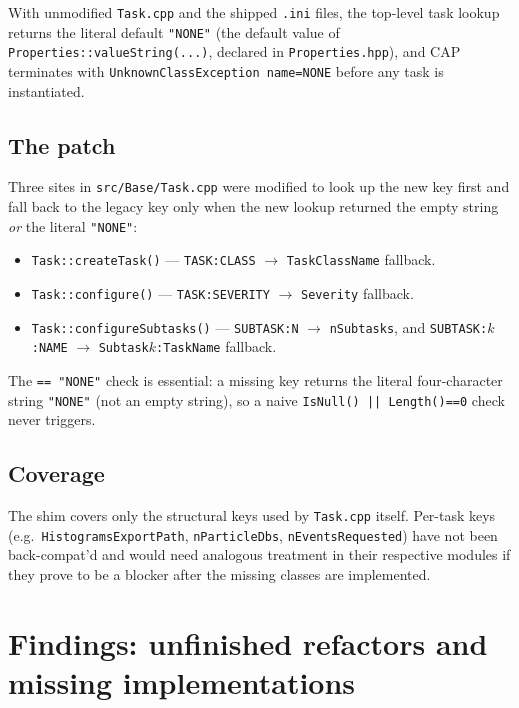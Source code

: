 \documentclass[11pt,a4paper]{article}
\begin{document}
\noindent
With unmodified \texttt{Task.cpp} and the shipped \texttt{.ini} files, the
top-level task lookup returns the literal default
\texttt{"NONE"} (the default value of
\texttt{Properties::valueString(...)},
declared in \texttt{Properties.hpp}), and CAP terminates with
\texttt{UnknownClassException name=NONE} before any task is instantiated.

\subsection{The patch}

Three sites in \texttt{src/Base/Task.cpp} were modified to look up the new
key first and fall back to the legacy key only when the new lookup
returned the empty string \emph{or} the literal \texttt{"NONE"}:

\begin{itemize}[leftmargin=2em,itemsep=0pt]
  \item \texttt{Task::createTask()} --- \texttt{TASK:CLASS}
        $\to$ \texttt{TaskClassName} fallback.
  \item \texttt{Task::configure()} --- \texttt{TASK:SEVERITY}
        $\to$ \texttt{Severity} fallback.
  \item \texttt{Task::configureSubtasks()} ---
        \texttt{SUBTASK:N} $\to$ \texttt{nSubtasks}, and
        \texttt{SUBTASK:$k$:NAME} $\to$ \texttt{Subtask$k$:TaskName} fallback.
\end{itemize}

\noindent
The \texttt{== "NONE"} check is essential: a missing key returns the
literal four-character string \texttt{"NONE"} (not an empty string), so a
naive \texttt{IsNull()~||~Length()==0} check never triggers.

\subsection{Coverage}

The shim covers only the structural keys used by \texttt{Task.cpp} itself.
Per-task keys (e.g.\ \texttt{HistogramsExportPath},
\texttt{nParticleDbs}, \texttt{nEventsRequested}) have not been
back-compat'd and would need analogous treatment in their respective
modules if they prove to be a blocker after the missing classes are
implemented.

\section{Findings: unfinished refactors and missing implementations}
\end{document}
